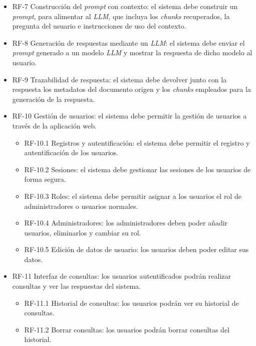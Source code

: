 \begin{itemize}
\begin{itemize}
	\tightlist
		\item RF-6.1 Generación de \textit{embedding}: el sistema debe generar el \textit{embedding} de la consulta del usuario.
		\item RF-6.2 Búsqueda por similitud: el sistema debe realizar una búsqueda por similitud en la base de datos vectorial.
	\end{itemize}
	\item RF-7 Construcción del \textit{prompt} con contexto: el sistema debe construir un \textit{prompt}, para alimentar al \textit{LLM}, que incluya los \textit{chunks} recuperados, la pregunta del usuario e instrucciones de uso del contexto.
	\item RF-8 Generación de respuestas mediante un \textit{LLM}: el sistema debe enviar el \textit{prompt} generado a un modelo \textit{LLM} y mostrar la respuesta de dicho modelo al usuario.
	\item RF-9 Trazabilidad de respuesta: el sistema debe devolver junto con la respuesta los metadatos del documento origen y los \textit{chunks} empleados para la generación de la respuesta. 
	\item RF-10 Gestión de usuarios: el sistema debe permitir la gestión de usuarios a través de la aplicación web.
	\begin{itemize}
	\tightlist
		\item RF-10.1 Registros y autentificación: el sistema debe permitir el registro y autentificación de los usuarios.
		\item RF-10.2 Sesiones: el sistema debe gestionar las sesiones de los usuarios de forma segura.
		\item RF-10.3 Roles: el sistema debe permitir asignar a los usuarios el rol de administradores o usuarios normales.
		\item RF-10.4 Administradores: los administradores deben poder añadir usuarios, eliminarlos y cambiar su rol.
		\item RF-10.5 Edición de datos de usuario: los usuarios deben poder editar sus datos.
	\end{itemize}
	\item RF-11 Interfaz de consultas: los usuarios autentificados podrán realizar consultas y ver las respuestas del sistema.
	\begin{itemize}
	\tightlist
		\item RF-11.1 Historial de consultas: los usuarios podrán ver su historial de consultas.
		\item RF-11.2 Borrar consultas: los usuarios podrán borrar consultas del historial.

\end{itemize}
\end{itemize}
